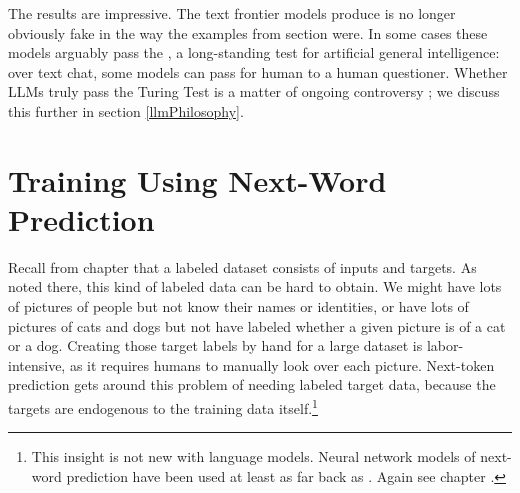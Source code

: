 The results are impressive. The text frontier models produce is no longer
obviously fake in the way the examples from section
 were. In some cases these models arguably pass
the , a long-standing test for artificial general
intelligence: over text chat, some models can pass for human to a human
questioner. Whether LLMs truly pass the Turing Test is a matter of ongoing
controversy \cite{jones2024does}; we discuss this further in section \ref{llmPhilosophy}.

\section{Training Using Next-Word Prediction}

Recall from chapter  that a labeled dataset consists of
inputs and targets. As noted there, this kind of labeled data can be hard to
obtain. We might have lots of pictures of people but not know their names or
identities, or have lots of pictures of cats and dogs but not have labeled
whether a given picture is of a cat or a dog. Creating those target labels by
hand for a large dataset is labor-intensive, as it requires humans to manually
look over each picture. Next-token prediction gets around this problem of needing labeled target data, because the 
targets are endogenous to the training data itself.\footnote{This insight is not new with language models. Neural network models of next-word prediction have been used at least as far back as \cite{elman1990finding}. Again see chapter . }

